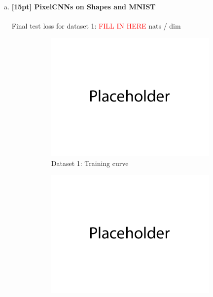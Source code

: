 \documentclass{article}
\begin{document}
\newpage
{}

\begin{enumerate}[(a)]
\item {\bf [15pt] PixelCNNs on Shapes and MNIST} \\\\
Final test loss for dataset 1: \textcolor{red}{FILL IN HERE}  nats / dim
\begin{figure}[H]
    \centering
    \begin{subfigure}{0.45\textwidth}
        \centering
        \includegraphics[width=\textwidth]{figures/placeholder.png}
        \caption{Dataset 1: Training curve}
    \end{subfigure}
    \hspace{0.2in}
    \begin{subfigure}{0.45\textwidth}
        \centering
        \includegraphics[width=\textwidth]{figures/placeholder.png}

\end{subfigure}
\end{figure}
\end{enumerate}
\end{document}
